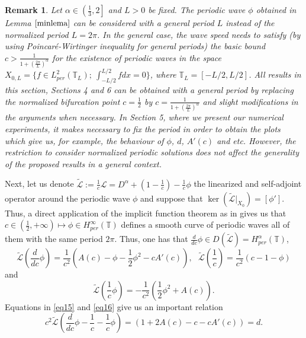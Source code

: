 \documentclass[12pt,reqno]{amsart}
\newcommand{\2}{L^2_{per}(0, T)}
\numberwithin{equation}{section}
\numberwithin{figure}{section}
\newtheorem{remark}[theorem]{Remark}
\begin{document}
\begin{remark}
	Let $\alpha\in \left(\frac{1}{3},2\right]$ and $L>0$ be fixed. The periodic wave $\phi$ obtained in Lemma $\ref{minlema}$ can be considered with a general period $L$ instead of the normalized period $L=2\pi$. In the general case, the wave speed needs to satisfy (by using Poincar\'e-Wirtinger inequality for general periods) the basic bound $c>\frac{1}{1+\left(\frac{2\pi}{L}\right)^{\alpha}}$ for the existence of periodic waves in the space $X_{0,L}=\{f\in L_{per}^2(\mathbb{T}_L);\ \int_{-L/2}^{L/2}fdx=0\}$, where $\mathbb{T}_{L}=[-L/2,L/2]$. All results in this section, Sections 4 and 6 can be obtained with a general period by replacing the normalized bifurcation point $c=\frac{1}{2}$ by  $c=\frac{1}{1+\left(\frac{2\pi}{L}\right)^{\alpha}}$ and slight modifications in the arguments when necessary. In Section 5, where we present our numerical experiments, it makes necessary to fix the period in order to obtain the plots which give us, for example, the behaviour of $\phi$, $d$, $A'(c)$ and etc. However, the restriction to consider normalized periodic solutions does not affect the generality of the proposed results in a general context.
\end{remark}
\indent Next, let us denote $\mathcal{\tilde{L}}:=\frac{1}{c}\mathcal{L}=D^{\alpha}+ (1 - \frac{1}{c}) - \frac{1}{c}\phi$
the linearized and self-adjoint operator around the periodic wave $\phi$ and suppose that $\ker(\mathcal{\tilde{L}}|_{X_0})=[\phi']$. Thus, a direct application of the implicit function theorem as in \cite[Lemma 3.8]{NPL} gives us that $c\in (\frac{1}{2},+\infty)\mapsto\phi\in H_{per}^{\infty}(\mathbb{T})$ defines a smooth curve of periodic waves all of them with the same period $2\pi$. Thus, one has that $\frac{d}{dc}\phi\in D(\tilde{\mathcal{L}})=H_{per}^{\alpha}(\mathbb{T})$,
\begin{equation}\label{eq15}
\displaystyle \mathcal{\tilde{L}}\left(\frac{d}{dc}\phi\right) = \frac{1}{c^2}\left(A(c)- \phi - \frac{1}{2}\phi^2 - cA'(c) \right), \ \ \ \mathcal{\tilde{L}}\left(\frac{1}{c}\right)= \frac{1}{c^2} \left(c-1- \phi \right)
\end{equation}
and
\begin{equation}\label{eq16}
\displaystyle \mathcal{\tilde{L}}\left( \frac{1}{c}\phi\right) = -\frac{1}{c^2}\left(\frac{1}{2}\phi^2+ A(c)\right).
\end{equation}
Equations in \eqref{eq15} and \eqref{eq16} give us an important relation
\begin{equation}\label{vd1}
c^2\mathcal{\tilde{L}}\left(\frac{d}{dc} \phi - \frac{1}{c}-\frac{1}{c}\phi\right) =\left(1 +2A(c) -c -cA'(c)\right)=d.
\end{equation}
\end{document}
